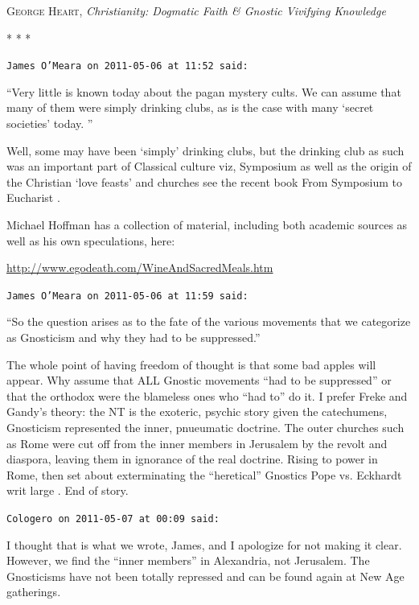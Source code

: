 \textsc{George Heart}, \textit{Christianity: Dogmatic Faith \& Gnostic Vivifying Knowledge}



\begin{center}* * *\end{center}

\begin{footnotesize}
\begin{sffamily}
\texttt{James O'Meara on 2011-05-06 at 11:52 said:}

``Very little is known today about the pagan mystery cults. We can assume that many of them were simply drinking clubs, as is the case with many `secret societies' today. ''

Well, some may have been `simply' drinking clubs, but the drinking club as such was an important part of Classical culture viz, Symposium as well as the origin of the Christian `love feasts' and churches see the recent book From Symposium to Eucharist .

Michael Hoffman has a collection of material, including both academic sources as well as his own speculations, here:

\url{http://www.egodeath.com/WineAndSacredMeals.htm}


\hfill

\texttt{James O'Meara on 2011-05-06 at 11:59 said:}

``So the question arises as to the fate of the various movements that we categorize as Gnosticism and why they had to be suppressed.''

The whole point of having freedom of thought is that some bad apples will appear. Why assume that ALL Gnostic movements ``had to be suppressed'' or that the orthodox were the blameless ones who ``had to'' do it. I prefer Freke and Gandy's theory: the NT is the exoteric, psychic story given the catechumens, Gnosticism represented the inner, pnueumatic doctrine. The outer churches such as Rome were cut off from the inner members in Jerusalem by the revolt and diaspora, leaving them in ignorance of the real doctrine. Rising to power in Rome, then set about exterminating the ``heretical'' Gnostics Pope vs. Eckhardt writ large . End of story.

\hfill

\texttt{Cologero on 2011-05-07 at 00:09 said:}

I thought that is what we wrote, James, and I apologize for not making it clear. However, we find the ``inner members'' in Alexandria, not Jerusalem. The Gnosticisms have not been totally repressed and can be found again at New Age gatherings.


\end{sffamily}
\end{footnotesize}
